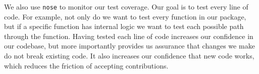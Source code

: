 
%
%


We also use \texttt{nose} to monitor our test coverage.  Our goal is to
test every line of code.  For example, not only do we want to test every
function in our package, but if a specific function has internal logic
we want to test each possible path through the function.  Having tested
each line of code increases our confidence in our codebase, but more
importantly provides us assurance that changes we make do not break
existing code.  It also increases our confidence that new code works,
which reduces the friction of accepting contributions.

%
%

